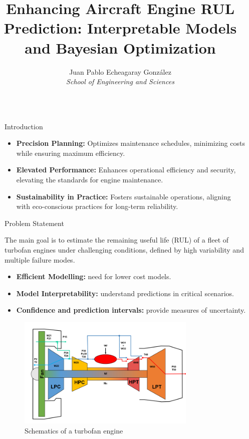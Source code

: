 \documentclass[final, 12pt]{beamer}
\title{Enhancing Aircraft Engine RUL Prediction: Interpretable Models and Bayesian Optimization}
\author{Juan Pablo Echeagaray González \\ \textit{School of Engineering and Sciences}}
\newlength{\sepwidth}
\newlength{\colwidth}
\newlength{\smallcolwidth}
\newcommand{\separatorcolumn}{\begin{column}{\sepwidth}\end{column}}
\begin{document}
\begin{frame}[t]
\begin{columns}[t]
\separatorcolumn

\begin{column}{\smallcolwidth}

    \begin{block}{Introduction}

        \begin{itemize}
            \item \textbf{Precision Planning:} Optimizes maintenance schedules, minimizing costs while ensuring maximum efficiency.
            \item \textbf{Elevated Performance:} Enhances operational efficiency and security, elevating the standards for engine maintenance.
            \item \textbf{Sustainability in Practice:} Fosters sustainable operations, aligning with eco-conscious practices for long-term reliability.
        \end{itemize}

    \end{block}

    \begin{block}{Problem Statement}

        The main goal is to estimate the remaining useful life (RUL) of a ﬂeet of turbofan engines under challenging conditions, defined by high variability and multiple failure modes.
        \begin{itemize}
            \item \textbf{Efficient Modelling:} need for lower cost models.
            \item \textbf{Model Interpretability:} understand predictions in critical scenarios.
            \item \textbf{Confidence and prediction intervals:} provide measures of uncertainty.
        \end{itemize}

        \begin{figure}
            \centering
            \includegraphics[width=0.8\textwidth]{figures/cmapss_turbofan.png}
            \caption{Schematics of a turbofan engine}
        \end{figure}


\end{block}
\end{column}
\end{columns}
\end{frame}
\end{document}
